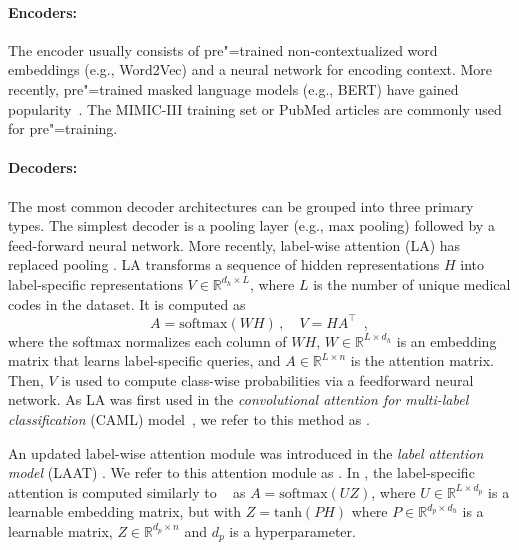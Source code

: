 {\paragraph{Encoders:}
The encoder usually consists of pre"=trained non-contextualized word embeddings (e.g., Word2Vec) and a neural network for encoding context. More recently, pre"=trained masked language models (e.g., BERT) have gained popularity~\parencite{tengReviewDeepNeural2022}. The MIMIC-III training set or PubMed articles are commonly used for pre"=training.

\paragraph{Decoders:}
The most common decoder architectures can be grouped into three primary types. 
The simplest decoder is a pooling layer (e.g., max pooling) followed by a feed-forward neural network. More recently, label-wise attention (LA) \parencite{mullenbachExplainablePredictionMedical2018} has replaced pooling \parencite{vuLabelAttentionModel2020, liuEffectiveConvolutionalAttention2021, huangPLMICDAutomaticICD2022, liICDCodingClinical2020}. LA transforms a sequence of hidden representations $H$ into label-specific representations $V \in \mathbb{R}^{d_h \times L}$, where $L$ is the number of unique medical codes in the dataset.
It is computed as
\begin{equation}
    A = \text{softmax}(WH) \, , \quad
    V = HA^{\top} \enspace ,
\end{equation}
where the softmax normalizes each column of $WH$, $W \in \mathbb{R}^{L \times d_h}$ is an embedding matrix that learns label-specific queries, and $A \in \mathbb{R}^{L \times n}$ is the attention matrix. 
Then, $V$ is used to compute class-wise probabilities via a feedforward neural network. 
As LA was first used in the \textit{convolutional attention for multi-label classification} (CAML) model~\parencite{mullenbachExplainablePredictionMedical2018}, we refer to this method as \lacaml.

An updated label-wise attention module was introduced in the \textit{label attention model} (LAAT) \parencite{vuLabelAttentionModel2020}. We refer to this attention module as \lalaat. In \lalaat, the label-specific attention is computed similarly to  \lacaml~ as $A = \text{softmax}(UZ)$, where $U \in \mathbb{R}^{L \times d_p}$ is a learnable embedding matrix, but with 
$Z = \text{tanh}(PH)$ 
where $P \in \mathbb{R}^{d_p \times d_h}$ is a learnable matrix, $Z \in \mathbb{R}^{d_p \times n}$ and $d_p$ is a hyperparameter.


}
